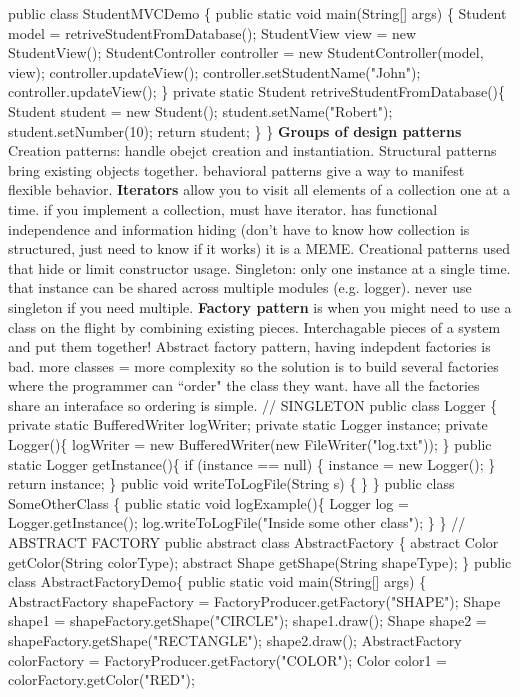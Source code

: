 \documentclass[10pt]{article}
\begin{document}
\begin{landscape}
\begin{multicols*}{6}
public class StudentMVCDemo \{
public static void main(String[] args) \{
Student model  = retriveStudentFromDatabase();
StudentView view = new StudentView();
StudentController controller = new StudentController(model, view);
controller.updateView();
controller.setStudentName("John");
controller.updateView();
\}
private static Student retriveStudentFromDatabase()\{
Student student = new Student();
student.setName("Robert");
student.setNumber(10);
return student;
\}
\}
\textbf{Groups of design patterns}
Creation patterns: handle obejct creation and instantiation. Structural patterns bring existing objects together. behavioral patterns give a way to manifest flexible behavior. \textbf{Iterators} allow you to visit all elements of a collection one at a time. if you implement a collection, must have iterator. has functional independence and information hiding (don't have to know how collection is structured, just need to know if it works) it is a MEME. Creational patterns used that hide or limit constructor usage. Singleton: only one instance at a single time. that instance can be shared across multiple modules (e.g. logger). never use singleton if you need multiple. \textbf{Factory pattern} is when you might need to use a class on the flight by combining existing pieces. Interchagable pieces of a system and put them together! Abstract factory pattern, having indepdent factories is bad. more classes = more complexity so the solution is to build several factories where the programmer can ``order" the class they want. have all the factories share an interaface so ordering is simple. 
// SINGLETON
public class Logger \{
private static BufferedWriter logWriter;
private static Logger instance;
private Logger()\{
logWriter = new BufferedWriter(new FileWriter("log.txt"));
\}
public static Logger getInstance()\{
if (instance == null) \{
instance = new Logger();
\}
return instance;
\}
public void writeToLogFile(String s) \{
\}
\}
public class SomeOtherClass \{
public static void logExample()\{
Logger log = Logger.getInstance();
log.writeToLogFile("Inside some other class");
\}
\}
// ABSTRACT FACTORY
public abstract class AbstractFactory \{
abstract Color getColor(String colorType);
abstract Shape getShape(String shapeType);
\}
public class AbstractFactoryDemo\{
public static void main(String[] args) \{
AbstractFactory shapeFactory = FactoryProducer.getFactory("SHAPE");
Shape shape1 = shapeFactory.getShape("CIRCLE");
shape1.draw();
Shape shape2 = shapeFactory.getShape("RECTANGLE");
shape2.draw();
AbstractFactory colorFactory = FactoryProducer.getFactory("COLOR");
Color color1 = colorFactory.getColor("RED");

\end{multicols*}
\end{landscape}
\end{document}
